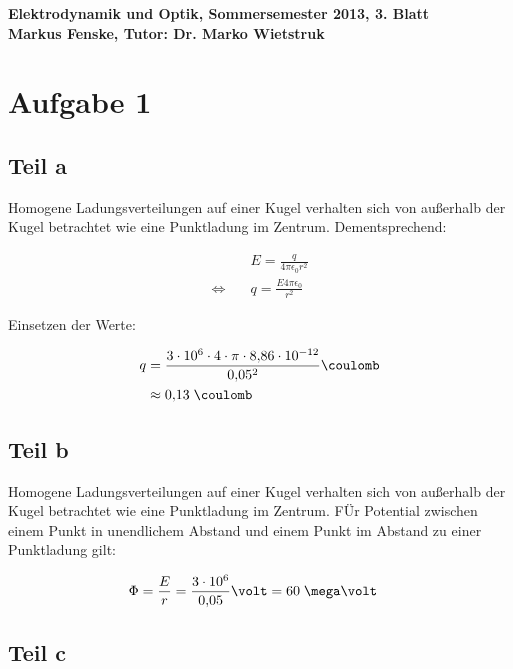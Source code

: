 \documentclass[a4paper,german,12pt,smallheadings]{scrartcl}
\begin{document}
\begin{center}
\bfseries %
\sffamily %
\vspace{-40pt}
Elektrodynamik und Optik, Sommersemester 2013, 3. Blatt \\
Markus Fenske, Tutor: Dr. Marko Wietstruk
\vspace{-10pt}
\end{center}
\section*{Aufgabe 1}
\subsection*{Teil a}

Homogene Ladungsverteilungen auf einer Kugel verhalten sich von außerhalb der
Kugel betrachtet wie eine Punktladung im Zentrum. Dementsprechend:

\begin{align*}
  &E = \frac{q}{4 \pi \epsilon_0r^2} \\
  \Leftrightarrow \quad&q = \frac{E 4 \pi \epsilon_0}{r^2}
\end{align*}

Einsetzen der Werte:

\begin{align*}
  q &= \frac{3 \cdot 10^6 \cdot 4 \cdot \pi \cdot 8{,}86 \cdot 10^{-12}}{0{,}05^2} \coulomb \\
    & \approx 0{,}13 \;\coulomb
\end{align*}

\subsection*{Teil b}

Homogene Ladungsverteilungen auf einer Kugel verhalten sich von außerhalb der
Kugel betrachtet wie eine Punktladung im Zentrum. FÜr Potential zwischen einem
Punkt in unendlichem Abstand und einem Punkt im Abstand zu einer Punktladung gilt:

\begin{align*}
  \Phi &= \frac{E}{r} = \frac{3 \cdot 10^6}{0{,}05} \volt = 60 \;\mega\volt
\end{align*}

\subsection*{Teil c}
\end{document}

